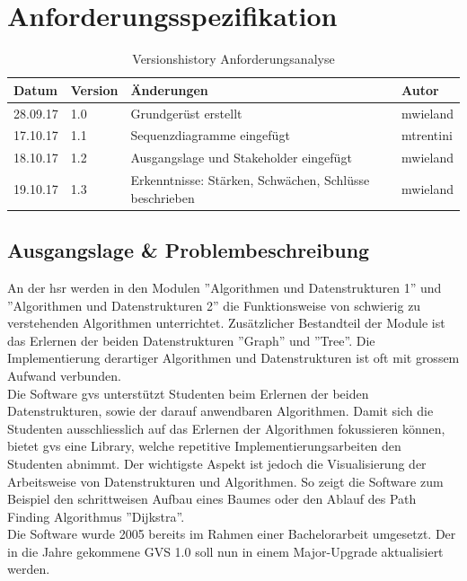 \documentclass[11pt,a4paper,english,oneside]{book}
\numberwithin{equation}{chapter}
\begin{document}
	
	\newpage
	\chapter{Anforderungsspezifikation}
	
	
	\begin{table}[h!]
		\centering
		\begin{tabularx}{\linewidth}{l l X l}
			\toprule 
			Datum & Version & Änderungen & Autor \\
			\midrule
			28.09.17 & 1.0 & Grundgerüst erstellt & mwieland \\
			17.10.17 & 1.1 & Sequenzdiagramme eingefügt & mtrentini \\
			18.10.17 & 1.2 & Ausgangslage und Stakeholder eingefügt & mwieland \\
			19.10.17 & 1.3 & Erkenntnisse: Stärken, Schwächen, Schlüsse beschrieben & mwieland \\
			\bottomrule 
		\end{tabularx} 
		\caption{Versionshistory Anforderungsanalyse} 
	\end{table}
	
	\section{Ausgangslage \& Problembeschreibung}
	An der \gls{hsr} werden in den Modulen ''Algorithmen und Datenstrukturen 1'' und ''Algorithmen und Datenstrukturen 2'' die Funktionsweise von schwierig zu verstehenden Algorithmen unterrichtet. Zusätzlicher Bestandteil der Module ist das Erlernen der beiden Datenstrukturen ''Graph'' und ''Tree''. Die Implementierung derartiger Algorithmen und Datenstrukturen ist oft mit grossem Aufwand verbunden. \\
	Die Software \gls{gvs} unterstützt Studenten beim Erlernen der beiden Datenstrukturen, sowie der darauf anwendbaren Algorithmen. Damit sich die Studenten ausschliesslich auf das Erlernen der Algorithmen fokussieren können, bietet \gls{gvs} eine Library, welche repetitive Implementierungsarbeiten den Studenten abnimmt. Der wichtigste Aspekt ist jedoch die Visualisierung der Arbeitsweise von Datenstrukturen und Algorithmen. So zeigt die Software zum Beispiel den schrittweisen Aufbau eines Baumes oder den Ablauf des Path Finding Algorithmus ''Dijkstra''. \\
	Die Software wurde 2005 bereits im Rahmen einer Bachelorarbeit umgesetzt. Der in die Jahre gekommene GVS 1.0 soll nun in einem Major-Upgrade aktualisiert werden.
	
\end{document}
